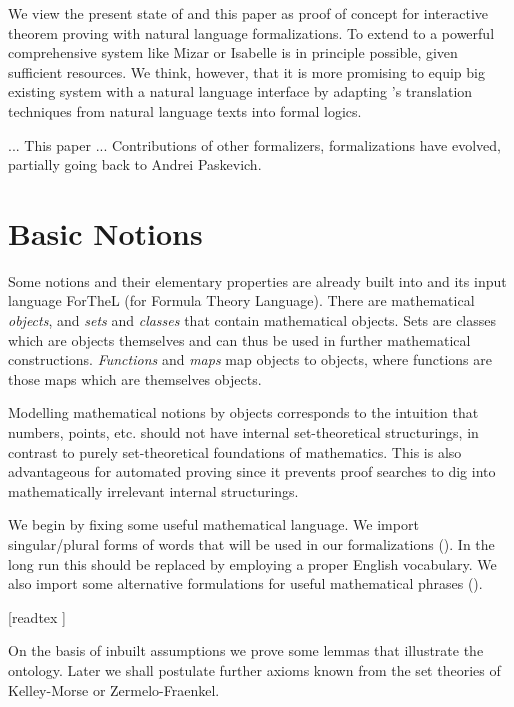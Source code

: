 \documentclass{article}
\begin{document}
We view the present state of \Naproche{} and this paper as proof of 
concept for interactive theorem
proving with natural language formalizations. 
To extend \Naproche{} to a powerful comprehensive
system like Mizar or Isabelle is in principle possible, 
given sufficient resources.
We think, however, that it is more promising to equip big existing
system with a natural language interface by adapting 
\Naproche's translation techniques
from natural language texts into formal logics.


... This paper ... Contributions of other formalizers, formalizations
have evolved, partially going back to Andrei Paskevich.

\section{Basic Notions}

Some notions and their elementary properties are already
built into \Naproche{} and its input language 
ForTheL (for Formula Theory Language). There are
mathematical {\em objects}, and {\em sets} and 
{\em classes} that contain mathematical
objects. Sets are classes which are objects themselves and
can thus be used in further mathematical constructions. 
{\em Functions}
and {\em maps} map objects to objects, where 
functions are those
maps which are themselves objects.

Modelling mathematical notions by objects corresponds
to the intuition that numbers, points, etc. should
not have internal set-theoretical
structurings, in contrast to purely set-theoretical
foundations of mathematics. This is also advantageous
for automated proving since it prevents proof searches to
dig into mathematically irrelevant internal structurings.

We begin by fixing some useful mathematical language. 
We import singular/plural forms of words that will be used in
our formalizations ().
In the long run this should be replaced by
employing a proper English vocabulary. We also
import some alternative formulations for
useful mathematical phrases ().

\begin{forthel}

  [readtex ]
\end{forthel}


On the basis of inbuilt assumptions we prove some 
lemmas that illustrate the \Naproche{} ontology. 
Later we shall postulate further axioms known from the
set theories of Kelley-Morse or Zermelo-Fraenkel.
\end{document}
